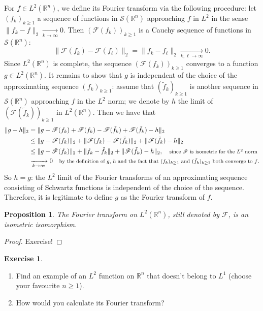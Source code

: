 \documentclass[a4paper, 12pt]{article}
\theoremstyle{plain}
\newtheorem{proposition}{Proposition}[section]
\theoremstyle{definition}
\newtheorem{exercise}{Exercise}
\theoremstyle{remark}
\numberwithin{equation}{section}
\begin{document}
For $f\in L^2({\mathds{R}}^n)$, we define its Fourier transform via the following procedure: let $(f_k)_{k\ge1}$ a sequence of 
functions in ${\mathscr{S}}({\mathds{R}}^n)$ approaching $f$ in $L^2$ in the sense $\|f_k-f\|_2\xrightarrow[k\to\infty]{}0$. 
Then $({\mathscr{F}}(f_k))_{k\ge 1}$ is a Cauchy sequence of functions in ${\mathscr{S}}({\mathds{R}}^n)$:
\[
\|{\mathscr{F}}(f_k)-{\mathscr{F}}(f_\ell)\|_2=\|f_k-f_\ell\|_2\xrightarrow[k,\ell\to\infty]{}0.
\] 
Since $L^2({\mathds{R}}^n)$ is complete, the sequence $({\mathscr{F}}(f_k))_{k\ge 1}$ converges to a function $g\in L^2({\mathds{R}}^n)$.
It remains to show that $g$ is independent of the choice of the approximating sequence $(f_k)_{k\ge1}$: assume that 
$(\tilde{f}_k)_{k\ge1}$ is another sequence in ${\mathscr{S}}({\mathds{R}}^n)$ approaching $f$ in the $L^2$ norm; we denote by
$h$ the limit of $({\mathscr{F}}(\tilde{f}_k))_{k\ge 1}$ in $L^2({\mathds{R}}^n)$. Then we have that
%
\begin{align*}
\|g-h\|_2&=\|g-{\mathscr{F}}(f_k)+{\mathscr{F}}(f_k)-{\mathscr{F}}(\tilde{f}_k)+{\mathscr{F}}(\tilde{f}_k)-h\|_2\\
&\le
\|g-{\mathscr{F}}(f_k)\|_2+\|{\mathscr{F}}(f_k)-{\mathscr{F}}(\tilde{f}_k)\|_2+\|{\mathscr{F}}(\tilde{f}_k)-h\|_2\\
&\le \|g-{\mathscr{F}}(f_k)\|_2+\|f_k-\tilde{f}_k\|_2+\|{\mathscr{F}}(\tilde{f}_k)-h\|_2, \quad 
\mbox{\footnotesize since ${\mathscr{F}}$ is isometric for the $L^2$ norm}\\
&\xrightarrow[k\to\infty]{}0 \quad \mbox{\footnotesize by the definition of $g$, $h$ and the fact that $(f_k)_{k\ge1}$ and $(\tilde{f}_k)_{k\ge1}$
both converge to $f$}.
\end{align*}
%
So $h=g$: the $L^2$ limit of the Fourier transforms of an approximating sequence consisting of Schwartz functions is independent 
of the choice of the sequence. Therefore, it is legitimate to define $g$ as the Fourier transform of $f$.

\begin{proposition}
The Fourier transform on $L^2({\mathds{R}}^n)$, still denoted by ${\mathscr{F}}$, is an isometric isomorphism.
\end{proposition}

\begin{proof}
Exercise!
\end{proof}

\begin{exercise}
\begin{enumerate}
\item
Find an example of an $L^2$ function on ${\mathds{R}}^n$ that doesn't belong to $L^1$ (choose your favourite $n\ge 1$).
\item
How would you calculate its Fourier transform?
\end{enumerate}
\end{exercise}
\end{document}
